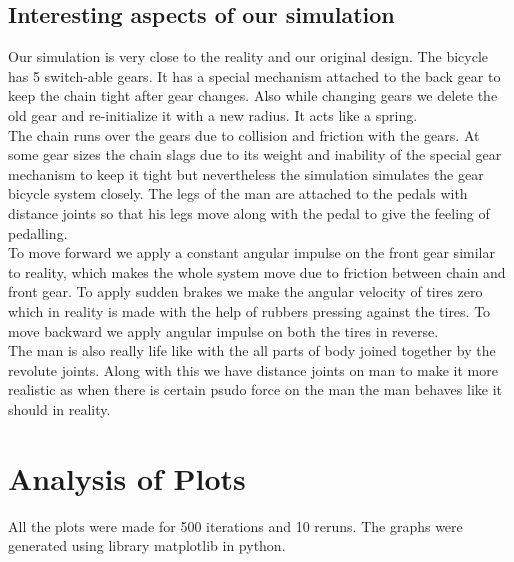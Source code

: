 \documentclass[11pt]{article}
\begin{document}
\subsection{Interesting aspects of our simulation}
Our simulation is very close to the reality and our original design. The bicycle has 5 switch-able gears. It has a special mechanism attached to the back gear to keep the chain tight after gear changes. Also while changing gears we delete the old gear and re-initialize it with a new radius. It acts like a spring.\\
The chain runs over the gears due to collision and friction with the gears. At some gear sizes the chain slags due to its weight and inability of the special gear mechanism to keep it tight but nevertheless the simulation simulates the gear bicycle system closely. The legs of the man are attached to the pedals with distance joints so that his legs move along with the pedal to give the feeling of pedalling.\\
To move forward we apply a constant angular impulse on the front gear similar to reality, which makes the whole system move due to friction between chain and front gear. To apply sudden brakes we make the angular velocity of tires zero which in reality is made with the help of rubbers pressing against the tires. To move backward we apply angular impulse on both the tires in reverse.\\
The man is also really life like with the all parts of body joined together by the revolute joints. Along with this we have distance joints on man to make it more realistic as when there is certain psudo force on the man the man behaves like it should in reality.       

\section{Analysis of Plots}
All the plots were made for 500 iterations and 10 reruns. The graphs were generated using library matplotlib\cite{matplot} in python.
\end{document}
